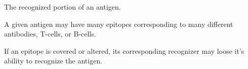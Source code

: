 The recognized portion of an antigen.

A given antigen may have many epitopes corresponding to many different antibodies, T-cells, or B-cells.  

If an epitope is covered or altered, its corresponding recognizer may loose it's ability to recognize the antigen.
